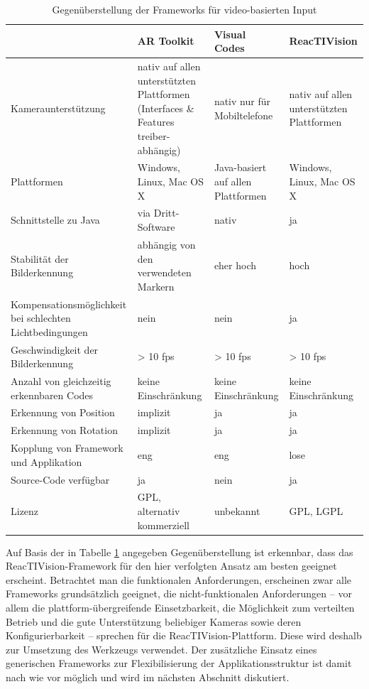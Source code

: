 \begin{table}[htbp]
	\begin{tabular}{| p{3cm} || p{3cm} | p{3cm} | p{3cm} |} \hline
		 & AR Toolkit & Visual Codes & ReacTIVision \\ \hline \hline
		Kamera\-unterstützung 		  		& nativ auf allen unterstützten Plattformen (Interfaces \& Features treiber-abhängig) & nativ nur für Mobiltelefone & nativ auf allen unterstützten Plattformen \\ \hline
		Plattformen 			  	  		&  Windows, Linux, Mac OS X  & Java-basiert auf allen Plattformen & Windows, Linux, Mac OS X \\ \hline
		Schnittstelle zu Java 		  		& via Dritt-Software & nativ & ja \\ \hline
		Stabilität der Bilderkennung 	  	& abhängig von den verwendeten Markern & eher hoch & hoch \\ \hline
		Kompensations\-möglichkeit bei schlechten Lichtbedingungen & nein & nein & ja \\ \hline
		Geschwindigkeit der Bilderkennung 	& > 10 fps & > 10 fps & > 10 fps \\ \hline
		Anzahl von gleichzeitig erkennbaren Codes 		  			& keine Einschränkung & keine Einschränkung & keine Einschränkung \\ \hline
		Erkennung von Position 		  		& implizit & ja & ja \\ \hline
		Erkennung von Rotation 				& implizit & ja & ja \\ \hline
		Kopplung von Framework und Applikation & eng & eng & lose \\ \hline
		Source-Code verfügbar 			  	& ja & nein & ja \\ \hline
		Lizenz 				 				& GPL, alternativ kommerziell & unbekannt & GPL, LGPL \\ \hline
	\end{tabular}
	\caption{Gegenüberstellung der Frameworks für video-basierten Input}
	\label{tab:videobasierterInput}
\end{table}

Auf Basis der in Tabelle \ref{tab:videobasierterInput} angegeben Gegenüberstellung ist erkennbar, dass das ReacTIVision-Framework für den hier verfolgten Ansatz am besten geeignet erscheint. Betrachtet man die funktionalen Anforderungen, erscheinen zwar alle Frameworks grundsätzlich geeignet, die nicht-funktionalen Anforderungen -- vor allem die plattform-übergreifende Einsetzbarkeit, die Möglichkeit zum verteilten Betrieb und die gute Unterstützung beliebiger Kameras sowie deren Konfigurierbarkeit -- sprechen für die ReacTIVision-Plattform. Diese wird deshalb zur Umsetzung des Werkzeugs verwendet. Der zusätzliche Einsatz eines generischen Frameworks zur Flexibilisierung der Applikationsstruktur ist damit nach wie vor möglich und wird im nächsten Abschnitt diskutiert.

